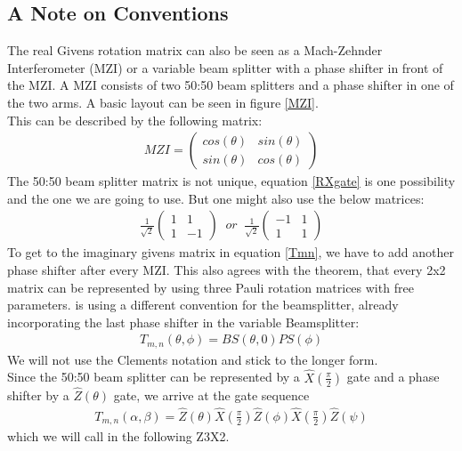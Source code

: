 \subsection{A Note on Conventions}
The real Givens rotation matrix can also be seen as a Mach-Zehnder Interferometer (MZI) or a variable beam splitter with a phase shifter in front of the MZI. A MZI consists of two 50:50 beam splitters and a phase shifter in one of the two arms. A basic layout can be seen in figure \ref{MZI}. \\
This can be described by the following matrix:
\begin{align}
    MZI = \begin{pmatrix}
        cos(\theta)& sin(\theta) \\
        sin(\theta) & cos(\theta)
    \end{pmatrix}
\end{align}
The 50:50 beam splitter matrix is not unique, equation \ref{RXgate} is one possibility and the one we are going to use. But one might also use the below matrices:
\begin{align}
    \frac{1}{\sqrt{2}}
    \begin{pmatrix}
        1& 1 \\
        1 & -1
    \end{pmatrix} 
    \;\; or \;\; 
        \frac{1}{\sqrt{2}}\begin{pmatrix}
        -1& 1 \\
        1 & 1
    \end{pmatrix} 
\end{align}
To get to the imaginary givens matrix in equation \ref{Tmn}, we have to add another phase shifter after every MZI. This also agrees with the theorem, that every 2x2 matrix can be represented by using three Pauli rotation matrices with free parameters. \cite{Clements:16} is using a different convention for the beamsplitter, already incorporating the last phase shifter in the variable Beamsplitter:
\begin{align}
    T_{m,n}(\theta,\phi) = BS(\theta,0)PS(\phi)
\end{align}
We will not use the Clements notation and stick to the longer form. \\
Since the 50:50 beam splitter can be represented by a $\widehat{X}(\frac{\pi}{2})$ gate and a phase shifter by a $\widehat{Z}(\theta)$ gate, we arrive at the gate sequence 
\begin{align}
    T_{m,n}(\alpha,\beta)=\widehat{Z}(\theta)\widehat{X}(\frac{\pi}{2})\widehat{Z}(\phi)\widehat{X}(\frac{\pi}{2})\widehat{Z}(\psi)
    \label{Z3X2}
\end{align}
which we will call in the following Z3X2.